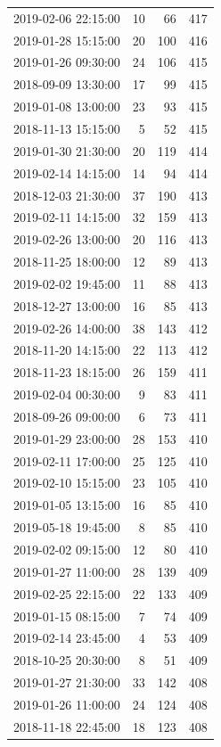\begin{tabular}{lrrr}
2019-02-06 22:15:00 & 10 & 66 & 417 \\
2019-01-28 15:15:00 & 20 & 100 & 416 \\
2019-01-26 09:30:00 & 24 & 106 & 415 \\
2018-09-09 13:30:00 & 17 & 99 & 415 \\
2019-01-08 13:00:00 & 23 & 93 & 415 \\
2018-11-13 15:15:00 & 5 & 52 & 415 \\
2019-01-30 21:30:00 & 20 & 119 & 414 \\
2019-02-14 14:15:00 & 14 & 94 & 414 \\
2018-12-03 21:30:00 & 37 & 190 & 413 \\
2019-02-11 14:15:00 & 32 & 159 & 413 \\
2019-02-26 13:00:00 & 20 & 116 & 413 \\
2018-11-25 18:00:00 & 12 & 89 & 413 \\
2019-02-02 19:45:00 & 11 & 88 & 413 \\
2018-12-27 13:00:00 & 16 & 85 & 413 \\
2019-02-26 14:00:00 & 38 & 143 & 412 \\
2018-11-20 14:15:00 & 22 & 113 & 412 \\
2018-11-23 18:15:00 & 26 & 159 & 411 \\
2019-02-04 00:30:00 & 9 & 83 & 411 \\
2018-09-26 09:00:00 & 6 & 73 & 411 \\
2019-01-29 23:00:00 & 28 & 153 & 410 \\
2019-02-11 17:00:00 & 25 & 125 & 410 \\
2019-02-10 15:15:00 & 23 & 105 & 410 \\
2019-01-05 13:15:00 & 16 & 85 & 410 \\
2019-05-18 19:45:00 & 8 & 85 & 410 \\
2019-02-02 09:15:00 & 12 & 80 & 410 \\
2019-01-27 11:00:00 & 28 & 139 & 409 \\
2019-02-25 22:15:00 & 22 & 133 & 409 \\
2019-01-15 08:15:00 & 7 & 74 & 409 \\
2019-02-14 23:45:00 & 4 & 53 & 409 \\
2018-10-25 20:30:00 & 8 & 51 & 409 \\
2019-01-27 21:30:00 & 33 & 142 & 408 \\
2019-01-26 11:00:00 & 24 & 124 & 408 \\
2018-11-18 22:45:00 & 18 & 123 & 408 \\

\end{tabular}
